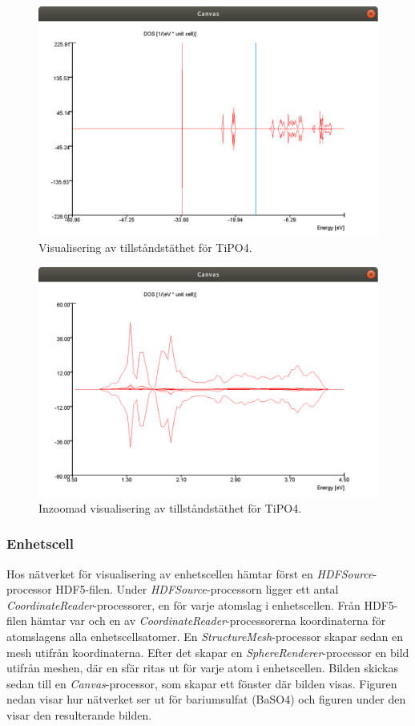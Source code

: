 \documentclass[10pt,oneside,swedish]{article}
\begin{document}
\begin{figure}[H]
\centering
\includegraphics[width=1.0000\textwidth]{Images/TotalDoS.png}
\caption{Visualisering av tillståndstäthet för TiPO4.}
\label{fig:DoS}
\end{figure}

\begin{figure}[H]
\centering
\includegraphics[width=1.0000\textwidth]{Images/ZoomedDoS.png}
\caption{Inzoomad visualisering av tillståndstäthet för TiPO4.}
\end{figure}



\subsubsection{Enhetscell}\label{enhetscell}

Hos nätverket för visualisering av enhetscellen hämtar först en
\emph{HDFSource}-processor HDF5-filen. Under \emph{HDFSource}-processorn
ligger ett antal \emph{CoordinateReader}-processorer, en för varje
atomslag i enhetscellen. Från HDF5-filen hämtar var och en av
\emph{CoordinateReader}-processorerna koordinaterna för atomslagens alla
enhetscellsatomer. En \emph{StructureMesh}-processor skapar sedan en
mesh utifrån koordinaterna. Efter det skapar en
\emph{SphereRenderer}-processor en bild utifrån meshen, där en sfär
ritas ut för varje atom i enhetscellen. Bilden skickas sedan till en
\emph{Canvas}-processor, som skapar ett fönster där bilden visas.
Figuren nedan visar hur nätverket ser ut för bariumsulfat (BaSO4) och
figuren under den visar den resulterande bilden.
\end{document}
